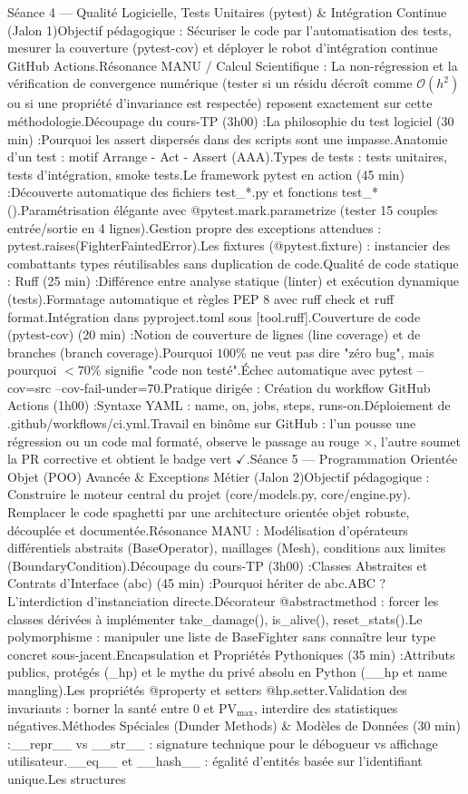 Séance 4 — Qualité Logicielle, Tests Unitaires (pytest) & Intégration Continue (Jalon 1)Objectif pédagogique : Sécuriser le code par l'automatisation des tests, mesurer la couverture (pytest-cov) et déployer le robot d'intégration continue GitHub Actions.Résonance MANU / Calcul Scientifique : La non-régression et la vérification de convergence numérique (tester si un résidu décroît comme $\mathcal{O}(h^2)$ ou si une propriété d'invariance est respectée) reposent exactement sur cette méthodologie.Découpage du cours-TP (3h00) :La philosophie du test logiciel (30 min) :Pourquoi les assert dispersés dans des scripts sont une impasse.Anatomie d'un test : motif Arrange - Act - Assert (AAA).Types de tests : tests unitaires, tests d'intégration, smoke tests.Le framework pytest en action (45 min) :Découverte automatique des fichiers test_*.py et fonctions test_*().Paramétrisation élégante avec @pytest.mark.parametrize (tester 15 couples entrée/sortie en 4 lignes).Gestion propre des exceptions attendues : pytest.raises(FighterFaintedError).Les fixtures (@pytest.fixture) : instancier des combattants types réutilisables sans duplication de code.Qualité de code statique : Ruff (25 min) :Différence entre analyse statique (linter) et exécution dynamique (tests).Formatage automatique et règles PEP 8 avec ruff check et ruff format.Intégration dans pyproject.toml sous [tool.ruff].Couverture de code (pytest-cov) (20 min) :Notion de couverture de lignes (line coverage) et de branches (branch coverage).Pourquoi $100\%$ ne veut pas dire "zéro bug", mais pourquoi $<70\%$ signifie "code non testé".Échec automatique avec pytest --cov=src --cov-fail-under=70.Pratique dirigée : Création du workflow GitHub Actions (1h00) :Syntaxe YAML : name, on, jobs, steps, runs-on.Déploiement de .github/workflows/ci.yml.Travail en binôme sur GitHub : l'un pousse une régression ou un code mal formaté, observe le passage au rouge $\times$, l'autre soumet la PR corrective et obtient le badge vert $\checkmark$.Séance 5 — Programmation Orientée Objet (POO) Avancée & Exceptions Métier (Jalon 2)Objectif pédagogique : Construire le moteur central du projet (core/models.py, core/engine.py). Remplacer le code spaghetti par une architecture orientée objet robuste, découplée et documentée.Résonance MANU : Modélisation d'opérateurs différentiels abstraits (BaseOperator), maillages (Mesh), conditions aux limites (BoundaryCondition).Découpage du cours-TP (3h00) :Classes Abstraites et Contrats d'Interface (abc) (45 min) :Pourquoi hériter de abc.ABC ? L'interdiction d'instanciation directe.Décorateur @abstractmethod : forcer les classes dérivées à implémenter take_damage(), is_alive(), reset_stats().Le polymorphisme : manipuler une liste de BaseFighter sans connaître leur type concret sous-jacent.Encapsulation et Propriétés Pythoniques (35 min) :Attributs publics, protégés (_hp) et le mythe du privé absolu en Python (__hp et name mangling).Les propriétés @property et setters @hp.setter.Validation des invariants : borner la santé entre $0$ et $\text{PV}_{\max}$, interdire des statistiques négatives.Méthodes Spéciales (Dunder Methods) & Modèles de Données (30 min) :__repr__ vs __str__ : signature technique pour le débogueur vs affichage utilisateur.__eq__ et __hash__ : égalité d'entités basée sur l'identifiant unique.Les structures 